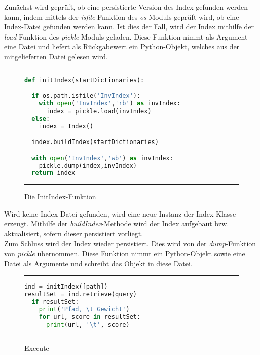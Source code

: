 Zunächst wird geprüft, ob eine persistierte Version des Index gefunden werden kann, indem mittels der \textit{isfile}-Funktion des \textit{os}-Moduls geprüft wird, ob eine Index-Datei gefunden werden kann.
Ist dies der Fall, wird der Index mithilfe der \textit{load}-Funktion des \textit{pickle}-Moduls geladen. Diese Funktion nimmt als Argument eine Datei und liefert als Rückgabewert ein Python-Objekt, welches aus der mitgelieferten Datei gelesen wird.

\begin{figure}
	\rule{\textwidth}{0.4pt}
	\begin{lstlisting}[language=Python]
def initIndex(startDictionaries):

  if os.path.isfile('InvIndex'):
    with open('InvIndex','rb') as invIndex:
      index = pickle.load(invIndex)
  else:
    index = Index()

  index.buildIndex(startDictionaries)

  with open('InvIndex','wb') as invIndex:
    pickle.dump(index,invIndex)
  return index
	\end{lstlisting}
	\rule{\textwidth}{0.4pt}
	\caption{Die InitIndex-Funktion}
	\label{fig:initIndex}
\end{figure}

Wird keine Index-Datei gefunden, wird eine neue Instanz der Index-Klasse erzeugt. Mithilfe der \textit{buildIndex}-Methode wird der Index aufgebaut bzw. aktualisiert, sofern dieser persistiert vorliegt.
\\
Zum Schluss wird der Index wieder persistiert. Dies wird von der \textit{dump}-Funktion von \textit{pickle} übernommen. Diese Funktion nimmt ein Python-Objekt sowie eine Datei als Argumente und schreibt das Objekt in diese Datei.

\begin{figure}
	\rule{\textwidth}{0.4pt}
		\begin{lstlisting}[language=Python]
ind = initIndex([path])
resultSet = ind.retrieve(query)
  if resultSet:
    print('Pfad, \t Gewicht')
    for url, score in resultSet:
      print(url, '\t', score)
		\end{lstlisting}
	\rule{\textwidth}{0.4pt}
	\caption{Execute}
	\label{fig:execute}
\end{figure}